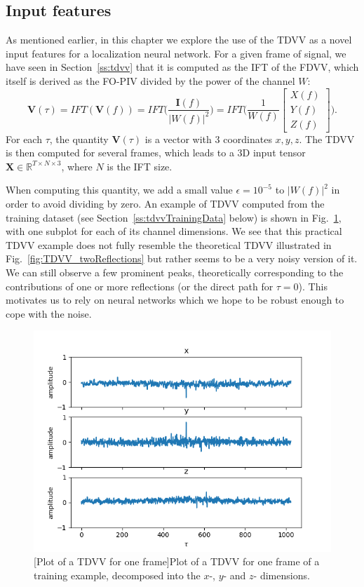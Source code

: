 \subsection{Input features}

As mentioned earlier, in this chapter we explore the use of the TDVV as a novel input features for a localization neural network. For a given frame of signal, we have seen in Section~\ref{ss:tdvv} that it is computed as the IFT of the FDVV, which itself is derived as the FO-PIV divided by the power of the channel $W$:
\begin{equation}
    \mathbf{V}(\tau) = IFT(\mathbf{V}(f)) = IFT \Bigg(\frac{\mathbf{I}(f)}{\lvert W(f) \rvert ^2}\Bigg) = 
    IFT\Bigg(\frac{1}{W(f)}
    \begin{bmatrix} X(f) \\ Y(f) \\ Z(f) \end{bmatrix}\Bigg).
\end{equation}
For each $\tau$, the quantity $\mathbf{V}(\tau)$ is a vector with $3$ coordinates $x,y,z$. The TDVV is then computed for several frames, which leads to a 3D input tensor $\mathbf{X} \in \mathbb{R}^{T \times N \times 3}$, where $N$ is the IFT size. 

When computing this quantity, we add a small value $\epsilon = 10^{-5}$ to $\lvert W(f) \rvert ^2$ in order to avoid dividing by zero. An example of TDVV computed from the training dataset (see Section~\ref{ss:tdvvTrainingData} below) is shown in Fig.~\ref{fig:tdvvPlot}, with one subplot for each of its channel dimensions. We see that this practical TDVV example does not fully resemble the theoretical TDVV illustrated in Fig.~\ref{fig:TDVV_twoReflections} but rather seems to be a very noisy version of it. We can still observe a few prominent peaks, theoretically corresponding to the contributions of one or more reflections (or the direct path for $\tau=0$). This motivates us to rely on neural networks which we hope to be robust enough to cope with the noise.

\begin{figure}[t]
    \begin{center}
    \includegraphics[width=0.7\linewidth]{Images/chap6/tdvvPlot.png}
    [Plot of a TDVV for one frame]{Plot of a TDVV for one frame of a training example, decomposed into the $x$-, $y$- and $z$- dimensions.}
    \label{fig:tdvvPlot}
    \end{center}
\end{figure}

